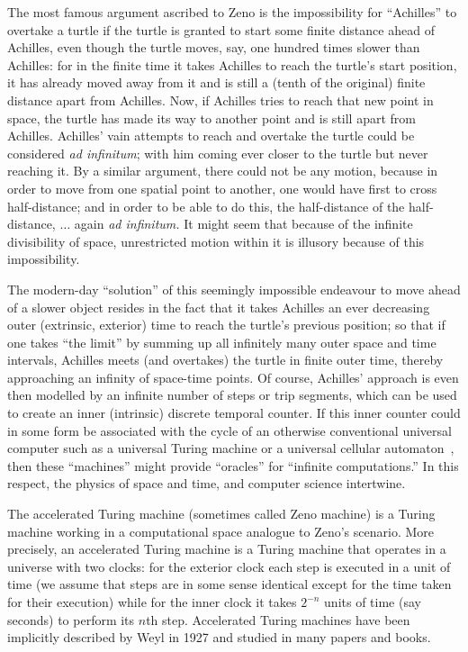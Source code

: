 \documentclass[11pt, pra,amsfonts,showpacs,showkeys]{revtex4}%
\begin{document}
The most famous argument ascribed to Zeno is the impossibility for ``Achilles'' to overtake a turtle if the turtle is granted
to start some finite distance ahead of Achilles, even though the turtle moves, say, one hundred times slower than Achilles:
for in the finite time it takes Achilles to reach the turtle's start position, it has already moved away from it and is still a
(tenth of the original) finite distance apart from Achilles. Now, if Achilles tries to reach that new point in space, the turtle
has made its way to another point and is still apart from Achilles.
Achilles' vain attempts to reach and overtake the turtle could be considered {\it ad infinitum}; with him coming ever closer to the
turtle but never reaching it.
By a similar argument, there could not be any motion, because in order to move from one spatial point to another,
one would have first to cross half-distance; and in order to be able to do this, the half-distance of the
half-distance, $\ldots$ again {\it ad infinitum.}
It might seem that because of the infinite divisibility of space, unrestricted motion within it is illusory because of this impossibility.

The modern-day ``solution'' of this seemingly impossible endeavour to move ahead of a slower object
resides in the fact that it takes Achilles an ever decreasing outer (extrinsic, exterior) time to reach
the turtle's previous position; so that if one takes ``the limit''
by summing up all infinitely many outer space and time intervals,
Achilles meets (and overtakes) the turtle in finite outer time,
thereby approaching an infinity of space-time points.
Of course, Achilles' approach is even then modelled by an infinite number of steps or trip segments,
which can be used to create an inner (intrinsic) discrete temporal counter.
If this inner counter could in some form be associated with the cycle of an otherwise conventional universal computer such as a universal
Turing machine or a universal cellular automaton~\cite{zuse-67,wolfram-2002},
then these ``machines'' might provide ``oracles'' for ``infinite computations.''
In this respect, the physics of space and time, and computer science intertwine.

The  accelerated Turing machine (sometimes called Zeno machine) is a Turing machine working in a
 computational space analogue to Zeno's scenario.  More precisely, an
accelerated Turing machine  is a Turing
machine that operates in a universe with two clocks: for  the exterior clock each step is executed in a unit of time (we assume that steps are in some sense identical except for the time
taken for their execution) while for
the inner clock it takes $2^{-n}$ units of time (say seconds) to perform its $n$th step.
Accelerated Turing machines have been implicitly described by Weyl
in 1927 and studied in many papers and books.
\end{document}
